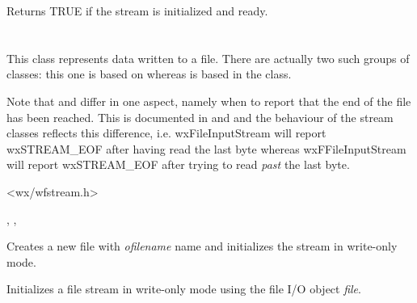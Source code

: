 Returns TRUE if the stream is initialized and ready.

\section{}\label{wxffileoutputstream}

This class represents data written to a file. There are actually
two such groups of classes: this one is based on  
whereas  is based in
the  class.

Note that  and  differ
in one aspect, namely when to report that the end of the file has been
reached. This is documented in  and 
 and the behaviour of the stream
classes reflects this difference, i.e. wxFileInputStream will report
wxSTREAM\_EOF after having read the last byte whereas wxFFileInputStream
will report wxSTREAM\_EOF after trying to read {\it past} the last byte.




<wx/wfstream.h>


, , 




Creates a new file with {\it ofilename} name and initializes the stream in
write-only mode. 


Initializes a file stream in write-only mode using the file I/O object {\it file}.


